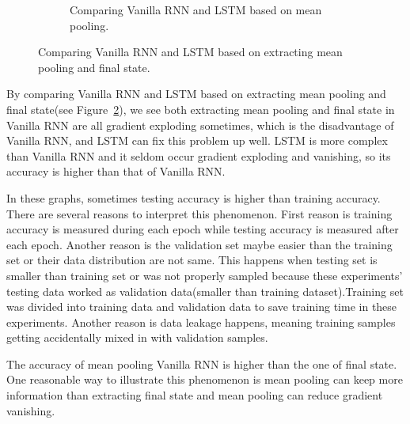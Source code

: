 \documentclass[12pt,letterpaper]{article}
\begin{document}
\begin{figure}[h]
\begin{subfigure}{0.49\textwidth}
    \caption{\small Comparing Vanilla RNN and LSTM based on mean pooling.} \label{fig:f}
    \end{subfigure}
    \caption{Comparing Vanilla RNN and LSTM based on extracting mean pooling and final state.}
    \label{fig:meanpool&finalstate}
\end{figure}

By comparing Vanilla RNN and LSTM based on extracting mean pooling and final state(see Figure~\ref{fig:meanpool&finalstate}), we see both extracting mean pooling and final state in Vanilla RNN are all gradient exploding sometimes, which is the disadvantage of Vanilla RNN, and LSTM can fix this problem up well. LSTM is more complex than Vanilla RNN and it seldom occur gradient exploding and vanishing, so its accuracy is higher than that of Vanilla RNN.

In these graphs, sometimes testing accuracy is higher than training accuracy. There are several reasons to interpret this phenomenon. First reason is training accuracy is measured during each epoch while testing accuracy is measured after each epoch. Another reason is the validation set maybe easier than the training set or their data distribution are not same. This happens when testing set is smaller than training set or was not properly sampled because these experiments' testing data worked as validation data(smaller than training dataset).Training set was divided into training data and validation data to save training time in these experiments. Another reason is data leakage happens, meaning training samples getting accidentally mixed in with validation samples.

The accuracy of mean pooling Vanilla RNN is higher than the one of final state. One reasonable way to illustrate this phenomenon is mean pooling can keep more information than extracting final state and mean pooling can reduce gradient vanishing. 
\end{document}
